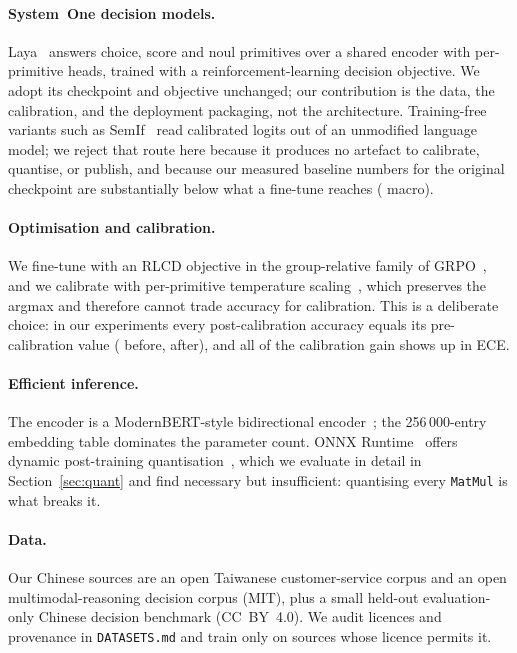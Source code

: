 \documentclass[11pt,a4paper]{article}
\begin{document}
\paragraph{System~One decision models.} Laya~\cite{laya} answers choice, score and noul primitives over a shared encoder with per-primitive heads, trained with a reinforcement-learning decision objective. We adopt its checkpoint and objective unchanged; our contribution is the data, the calibration, and the deployment packaging, not the architecture. Training-free variants such as SemIf~\cite{semif} read calibrated logits out of an unmodified language model; we reject that route here because it produces no artefact to calibrate, quantise, or publish, and because our measured baseline numbers for the original checkpoint are substantially below what a fine-tune reaches (\OrigAccMacro{} macro).

\paragraph{Optimisation and calibration.} We fine-tune with an RLCD objective in the group-relative family of GRPO~\cite{grpo}, and we calibrate with per-primitive temperature scaling~\cite{calibrated}, which preserves the argmax and therefore cannot trade accuracy for calibration. This is a deliberate choice: in our experiments every post-calibration accuracy equals its pre-calibration value (\MacroAccBefore{} before, \MacroAcc{} after), and all of the calibration gain shows up in ECE.

\paragraph{Efficient inference.} The encoder is a ModernBERT-style bidirectional encoder~\cite{modernbert}; the 256\,000-entry embedding table dominates the parameter count. ONNX Runtime~\cite{onnxruntime} offers dynamic post-training quantisation~\cite{dynamicquant}, which we evaluate in detail in Section~\ref{sec:quant} and find necessary but insufficient: quantising every \texttt{MatMul} is what breaks it.

\paragraph{Data.} Our Chinese sources are an open Taiwanese customer-service corpus and an open multimodal-reasoning decision corpus (MIT), plus a small held-out evaluation-only Chinese decision benchmark (CC~BY~4.0). We audit licences and provenance in \texttt{DATASETS.md} and train only on sources whose licence permits it.
\end{document}
